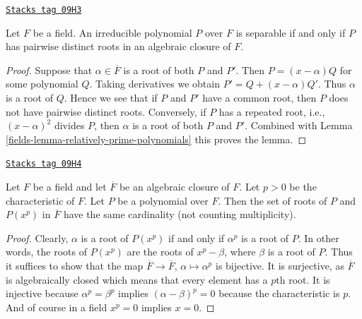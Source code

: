 \begin{lemma}
\label{fields-lemma-recognize-separable}
\href{https://stacks.math.columbia.edu/tag/09H3}{\texttt{Stacks tag 09H3}}

Let $F$ be a field. An irreducible polynomial $P$ over $F$
is separable if and only if $P$ has pairwise distinct roots in an
algebraic closure of $F$.
\end{lemma}

\begin{proof}

Suppose that $\alpha \in \overline{F}$ is a root of both $P$ and $P'$.
Then $P = (x - \alpha)Q$ for some polynomial $Q$. Taking derivatives
we obtain $P' = Q + (x - \alpha)Q'$. Thus $\alpha$ is a root of $Q$.
Hence we see that if $P$ and $P'$ have a common root, then $P$
does not have pairwise distinct roots. Conversely, if $P$ has
a repeated root, i.e., $(x - \alpha)^2$ divides $P$, then $\alpha$
is a root of both $P$ and $P'$. Combined with
Lemma \ref{fields-lemma-relatively-prime-polynomials} this proves the lemma.
\end{proof}

\begin{lemma}
\label{fields-lemma-nr-roots-unchanged}
\href{https://stacks.math.columbia.edu/tag/09H4}{\texttt{Stacks tag 09H4}}

Let $F$ be a field and let $\overline{F}$ be an algebraic closure of $F$.
Let $p > 0$ be the characteristic of $F$. Let $P$ be a polynomial
over $F$. Then the set of roots of $P$ and $P(x^p)$ in $\overline{F}$
have the same cardinality (not counting multiplicity).
\end{lemma}

\begin{proof}
Clearly, $\alpha$ is a root of $P(x^p)$ if and only if $\alpha^p$ is a
root of $P$. In other words, the roots of $P(x^p)$ are the roots of
$x^p - \beta$, where $\beta$ is a root of $P$. Thus it suffices to show
that the map $\overline{F} \to \overline{F}$, $\alpha \mapsto \alpha^p$
is bijective. It is surjective, as $\overline{F}$ is algebraically closed
which means that every element has a $p$th root. It is injective because
$\alpha^p = \beta^p$ implies $(\alpha - \beta)^p = 0$ because
the characteristic is $p$. And of course in a field $x^p = 0$ implies
$x = 0$.
\end{proof}

